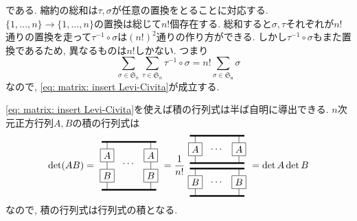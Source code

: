 \documentclass[dvipdfmx]{jsarticle}
\begin{document}
である.
縮約の総和は$\tau, \sigma$が任意の置換をとることに対応する.
$\{1,\dots,n\}\to\{1,\dots,n\}$の置換は総じて$n!$個存在する.
総和すると$\sigma,\tau$それぞれが$n!$通りの置換を走って$\tau^{-1}\circ\sigma$は$(n!)^2$通りの作り方ができる.
しかし$\tau^{-1}\circ\sigma$もまた置換であるため, 異なるものは$n!$しかない.
つまり
\begin{equation*}
    \sum_{\sigma\in\mathfrak{S}_n}
    \sum_{\tau\in\mathfrak{S}_n}
    \tau^{-1}\circ\sigma
    =
    n!\sum_{\sigma\in\mathfrak{S_n}}\sigma
\end{equation*}
なので, \eqref{eq: matrix: insert Levi-Civita}が成立する.

\eqref{eq: matrix: insert Levi-Civita}を使えば積の行列式は半ば自明に導出できる.
$n$次元正方行列$A, B$の積の行列式は
\begin{equation*}
    \det(AB)
    =
    \vcenter{\hbox{
        \begin{tikzpicture}
            \draw[ultra thick](0,0)--(2,0);
            \draw[ultra thick](0,-1.75)--(2,-1.75);
            \draw
                (.2,0)--++(0,-.25)
                node[anchor=north, draw, rectangle](A1){$A$}
                (A1.south)--++(0,-.25)
                node[anchor=north, draw, rectangle](B1){$B$}
                (B1.south)--++(0,-.25)
                (1.8,0)--++(0,-.25)
                node[anchor=north, draw, rectangle](A2){$A$}
                (A2.south)--++(0,-.25)
                node[anchor=north, draw, rectangle](B2){$B$}
                (B2.south)--++(0,-.25)
            ;
            \node at(1,-.8)[anchor=center]{$\cdots$};
        \end{tikzpicture}
    }}
    =
    \frac{1}{n!}
    \vcenter{\hbox{
        \begin{tikzpicture}
            \draw[ultra thick](0,0)--++(2,0);
            \draw[ultra thick](0,-1)--++(2,0);
            \draw[ultra thick](0,-1.2)--++(2,0);
            \draw[ultra thick](0,-2.2)--++(2,0);
            \draw
                (.2,0)--++(0,-.25)
                node[anchor=north,draw,rectangle](A1){$A$}
                (A1.south)--++(0,-.25)
                (1.8,0)--++(0,-.25)
                node[anchor=north,draw,rectangle](A2){$A$}
                (A2.south)--++(0,-.25)
            ;
            \draw
                (.2,-1.2)--++(0,-.25)
                node[anchor=north,draw,rectangle](B1){$B$}
                (B1.south)--++(0,-.25)
                (1.8,-1.2)--++(0,-.25)
                node[anchor=north,draw,rectangle](B2){$B$}
                (B2.south)--++(0,-.25)
            ;
            \node at(1,-.5)[anchor=center]{$\cdots$};
            \node at(1,-1.7)[anchor=center]{$\cdots$};
        \end{tikzpicture}
    }}
    =
    \det A\det B
\end{equation*}
なので, 積の行列式は行列式の積となる.
\end{document}
